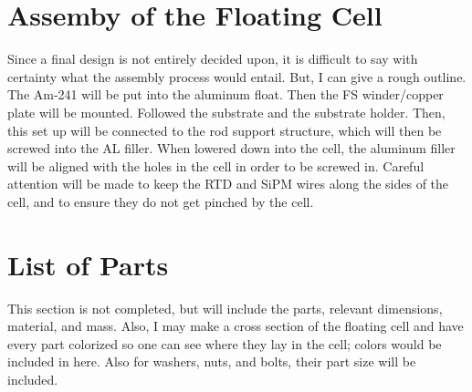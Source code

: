 \documentclass{article}%
\begin{document}
\section{Assemby of the Floating Cell}
Since a final design is not entirely decided upon, it is difficult to say with certainty what the assembly process would entail. But, I can give a rough outline. The Am-241 will be put into the aluminum float. Then the FS winder/copper plate will be mounted. Followed the substrate and the substrate holder. Then, this set up will be connected to the rod support structure, which will then be screwed into the AL filler. When lowered down into the cell, the aluminum filler will be aligned with the holes in the cell in order to be screwed in. Careful attention will be made to keep the RTD and SiPM wires along the sides of the cell, and to ensure they do not get pinched by the cell.


\section{List of Parts}
This section is not completed, but will include the parts, relevant dimensions, material, and mass. Also, I may make a cross section of the floating cell and have every part colorized so one can see where they lay in the cell; colors would be included in here. Also for washers, nuts, and bolts, their part size will be included.
\end{document}
